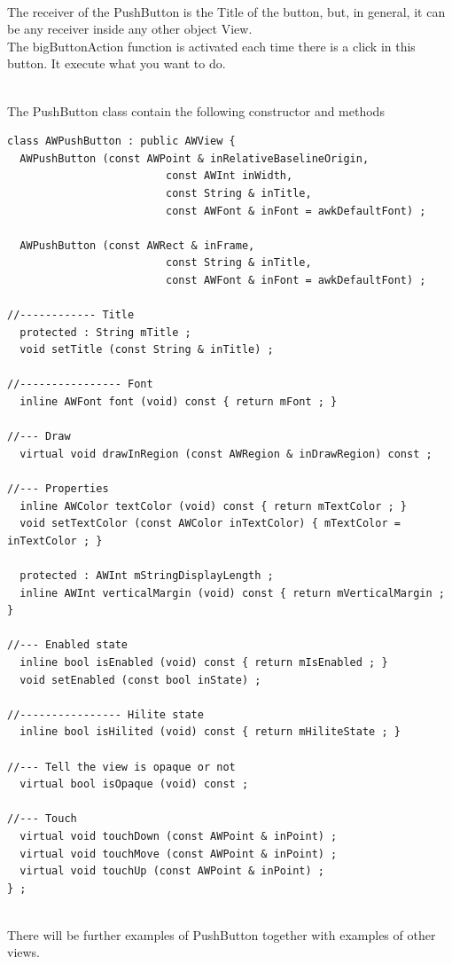 \documentclass[a4paper,11pt]{extarticle}
\begin{document}
~\\ The receiver of the PushButton is the Title of the button, but, in general, it can be any receiver inside any other object View.
~\\ The bigButtonAction function is activated each time there is a click in this button. It execute what you want to do.

~\\ The PushButton class contain the following constructor and methods

\begin{lstlisting}[language=Arduinonl]
class AWPushButton : public AWView {
  AWPushButton (const AWPoint & inRelativeBaselineOrigin,
                         const AWInt inWidth,
                         const String & inTitle,
                         const AWFont & inFont = awkDefaultFont) ;
  
  AWPushButton (const AWRect & inFrame,
                         const String & inTitle,
                         const AWFont & inFont = awkDefaultFont) ;
  
//------------ Title
  protected : String mTitle ;
  void setTitle (const String & inTitle) ;

//---------------- Font
  inline AWFont font (void) const { return mFont ; }

//--- Draw
  virtual void drawInRegion (const AWRegion & inDrawRegion) const ;

//--- Properties
  inline AWColor textColor (void) const { return mTextColor ; }
  void setTextColor (const AWColor inTextColor) { mTextColor = inTextColor ; }
  
  protected : AWInt mStringDisplayLength ;
  inline AWInt verticalMargin (void) const { return mVerticalMargin ; }

//--- Enabled state
  inline bool isEnabled (void) const { return mIsEnabled ; }
  void setEnabled (const bool inState) ;

//---------------- Hilite state
  inline bool isHilited (void) const { return mHiliteState ; }

//--- Tell the view is opaque or not
  virtual bool isOpaque (void) const ;

//--- Touch
  virtual void touchDown (const AWPoint & inPoint) ;
  virtual void touchMove (const AWPoint & inPoint) ;
  virtual void touchUp (const AWPoint & inPoint) ;
} ;
\end{lstlisting}

~\\There will be further examples of PushButton together with examples of other views.
\end{document}

